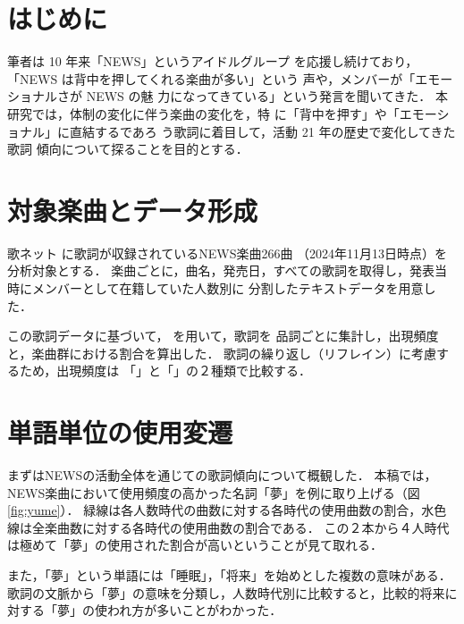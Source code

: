
\def\sectionmargin{\vspace{7pt}}

\section{はじめに}

筆者は 10 年来「NEWS」というアイドルグループ
を応援し続けており，%
「NEWS は背中を押してくれる楽曲が多い\cite{NEWS_Chill}」という
声や，メンバーが「エモーショナルさが NEWS の魅
力になってきている」という発言を聞いてきた．
本研究では，体制の変化に伴う楽曲の変化を，特
に「背中を押す」や「エモーショナル」に直結するであろ
う歌詞に着目して，活動 21 年の歴史で変化してきた歌詞
傾向について探ることを目的とする．

\sectionmargin
\section{対象楽曲とデータ形成}
歌ネット \cite{utanet}に歌詞が収録されているNEWS楽曲266曲
（2024年11月13日時点）を分析対象とする．
楽曲ごとに，曲名，発売日，すべての歌詞を取得し，発表当時にメンバーとして在籍していた人数別に
	分割したテキストデータを用意した．

この歌詞データに基づいて，
\khcoder\cite{khcoder}を用いて，歌詞を%
品詞ごとに集計し，出現頻度と，楽曲群における割合を算出した．
歌詞の繰り返し（リフレイン）に考慮するため，出現頻度は
「\kaisu 」と「\kyokusu 」の２種類で比較する．

\sectionmargin
\section{単語単位の使用変遷}

	まずはNEWSの活動全体を通じての歌詞傾向について概観した．
	本稿では，NEWS楽曲において使用頻度の高かった名詞「夢」を例に取り上げる（図\ref{fig:yume}）．
	緑線は各人数時代の曲数に対する各時代の使用曲数の割合，水色線は全楽曲数に対する各時代の使用曲数の割合である．
	この２本から４人時代は極めて「夢」の使用された割合が高いということが見て取れる．

	また，「夢」という単語には「睡眠」，「将来」を始めとした複数の意味がある．
	歌詞の文脈から「夢」の意味を分類し，人数時代別に比較すると，比較的将来に対する「夢」の使われ方が多いことがわかった．




